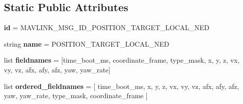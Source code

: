 \subsection*{Static Public Attributes}
\begin{DoxyCompactItemize}
\item 
\mbox{\label{classpymavlink_1_1dialects_1_1v10_1_1MAVLink__position__target__local__ned__message_a6701a68e1745bcbc1c4bc74d9c606a14}} 
{\bfseries id} = M\+A\+V\+L\+I\+N\+K\+\_\+\+M\+S\+G\+\_\+\+I\+D\+\_\+\+P\+O\+S\+I\+T\+I\+O\+N\+\_\+\+T\+A\+R\+G\+E\+T\+\_\+\+L\+O\+C\+A\+L\+\_\+\+N\+ED
\item 
\mbox{\label{classpymavlink_1_1dialects_1_1v10_1_1MAVLink__position__target__local__ned__message_a8ae11be9d06f1bbe1eba1d54595b7581}} 
string {\bfseries name} = \textquotesingle{}P\+O\+S\+I\+T\+I\+O\+N\+\_\+\+T\+A\+R\+G\+E\+T\+\_\+\+L\+O\+C\+A\+L\+\_\+\+N\+ED\textquotesingle{}
\item 
\mbox{\label{classpymavlink_1_1dialects_1_1v10_1_1MAVLink__position__target__local__ned__message_a87a4ad4063d84ba143c6ee2d8ed32234}} 
list {\bfseries fieldnames} = \mbox{[}\textquotesingle{}time\+\_\+boot\+\_\+ms\textquotesingle{}, \textquotesingle{}coordinate\+\_\+frame\textquotesingle{}, \textquotesingle{}type\+\_\+mask\textquotesingle{}, \textquotesingle{}x\textquotesingle{}, \textquotesingle{}y\textquotesingle{}, \textquotesingle{}z\textquotesingle{}, \textquotesingle{}vx\textquotesingle{}, \textquotesingle{}vy\textquotesingle{}, \textquotesingle{}vz\textquotesingle{}, \textquotesingle{}afx\textquotesingle{}, \textquotesingle{}afy\textquotesingle{}, \textquotesingle{}afz\textquotesingle{}, \textquotesingle{}yaw\textquotesingle{}, \textquotesingle{}yaw\+\_\+rate\textquotesingle{}\mbox{]}
\item 
\mbox{\label{classpymavlink_1_1dialects_1_1v10_1_1MAVLink__position__target__local__ned__message_ab7b80199b9d074cd94b5c218259f024e}} 
list {\bfseries ordered\+\_\+fieldnames} = \mbox{[} \textquotesingle{}time\+\_\+boot\+\_\+ms\textquotesingle{}, \textquotesingle{}x\textquotesingle{}, \textquotesingle{}y\textquotesingle{}, \textquotesingle{}z\textquotesingle{}, \textquotesingle{}vx\textquotesingle{}, \textquotesingle{}vy\textquotesingle{}, \textquotesingle{}vz\textquotesingle{}, \textquotesingle{}afx\textquotesingle{}, \textquotesingle{}afy\textquotesingle{}, \textquotesingle{}afz\textquotesingle{}, \textquotesingle{}yaw\textquotesingle{}, \textquotesingle{}yaw\+\_\+rate\textquotesingle{}, \textquotesingle{}type\+\_\+mask\textquotesingle{}, \textquotesingle{}coordinate\+\_\+frame\textquotesingle{} \mbox{]}

\end{DoxyCompactItemize}
